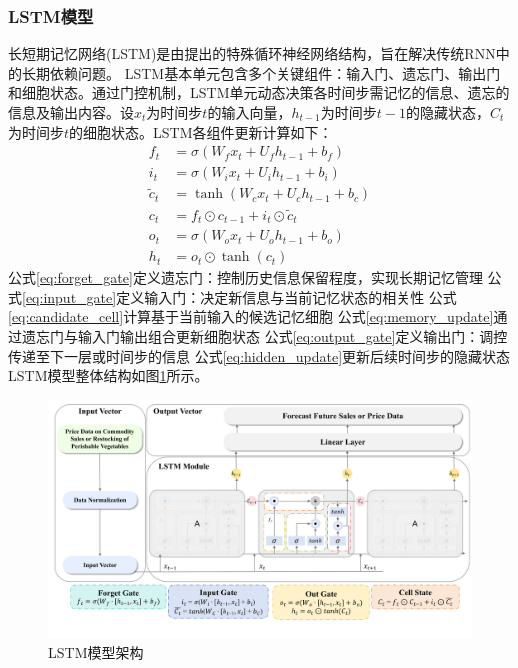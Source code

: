\documentclass[lang=cn,12pt,a4paper]{elegantpaper}
\begin{document}
\subsubsection{LSTM模型}
\label{subsubsec:lstm_model}
长短期记忆网络(LSTM)是由\citet{Hochreiter1997}提出的特殊循环神经网络结构，旨在解决传统RNN中的长期依赖问题。  
LSTM基本单元包含多个关键组件：输入门、遗忘门、输出门和细胞状态\citep{Hochreiter1997}。通过门控机制，LSTM单元动态决策各时间步需记忆的信息、遗忘的信息及输出内容\citep{Hochreiter1997}。设$x_t$为时间步$t$的输入向量，$h_{t-1}$为时间步$t-1$的隐藏状态，$C_t$为时间步$t$的细胞状态。LSTM各组件更新计算如下：
\begin{align}  
f_t &= \sigma(W_f x_t + U_f h_{t-1} + b_f) \label{eq:forget_gate}\\  
i_t &= \sigma(W_i x_t + U_i h_{t-1} + b_i) \label{eq:input_gate}\\  
\tilde{c}_t &= \tanh(W_c x_t + U_c h_{t-1} + b_c) \label{eq:candidate_cell}\\  
c_t &= f_t \odot c_{t-1} + i_t \odot \tilde{c}_t \label{eq:memory_update}\\  
o_t &= \sigma(W_o x_t + U_o h_{t-1} + b_o) \label{eq:output_gate}\\  
h_t &= o_t \odot \tanh(c_t) \label{eq:hidden_update}  
\end{align}
公式\eqref{eq:forget_gate}定义遗忘门：控制历史信息保留程度，实现长期记忆管理  
公式\eqref{eq:input_gate}定义输入门：决定新信息与当前记忆状态的相关性  
公式\eqref{eq:candidate_cell}计算基于当前输入的候选记忆细胞  
公式\eqref{eq:memory_update}通过遗忘门与输入门输出组合更新细胞状态  
公式\eqref{eq:output_gate}定义输出门：调控传递至下一层或时间步的信息  
公式\eqref{eq:hidden_update}更新后续时间步的隐藏状态  
LSTM模型整体结构如图\ref{fig:fig2}所示。

\begin{figure}[H]
        \centering
        \includegraphics[width=1\textwidth]{图片2.png}
        \caption{LSTM模型架构}
        \label{fig:fig2}
\end{figure}
\end{document}
